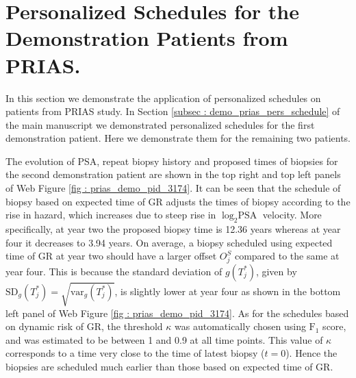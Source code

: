 \section{Personalized Schedules for the Demonstration Patients from PRIAS.}
\label{sec : demo_3174_2340}

In this section we demonstrate the application of personalized schedules on patients from PRIAS study. In Section \ref{subsec : demo_prias_pers_schedule} of the main manuscript we demonstrated personalized schedules for the first demonstration patient. Here we demonstrate them for the remaining two patients.

The evolution of PSA, repeat biopsy history and proposed times of biopsies for the second demonstration patient are shown in the top right and top left panels of Web Figure \ref{fig : prias_demo_pid_3174}. It can be seen that the schedule of biopsy based on expected time of GR adjusts the times of biopsy according to the rise in hazard, which increases due to steep rise in $\log_2 \mbox{PSA}$ velocity. More specifically, at year two the proposed biopsy time is 12.36 years whereas at year four it decreases to 3.94 years. On average, a biopsy scheduled using expected time of GR at year two should have a larger offset $O^S_j$ compared to the same at year four. This is because the standard deviation of $g(T^*_j)$, given by $\mbox{SD}_g(T^*_j) = \sqrt{\mbox{var}_g(T^*_j)}$, is slightly lower at year four as shown in the bottom left panel of Web Figure \ref{fig : prias_demo_pid_3174}. As for the schedules based on dynamic risk of GR, the threshold $\kappa$ was automatically chosen using $\mbox{F}_1$ score, and was estimated to be between 1 and 0.9 at all time points. This value of $\kappa$ corresponds to a time very close to the time of latest biopsy ($t=0$). Hence the biopsies are scheduled much earlier than those based on expected time of GR.

